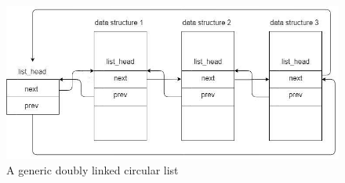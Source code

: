 \documentclass[10pt]{book}
\begin{document}
\begin{figure}[ht]
\includegraphics[width=\textwidth]{images/list.png}
\caption{A generic doubly linked circular list}
\label{img:list}
\end{figure}
\end{document}
